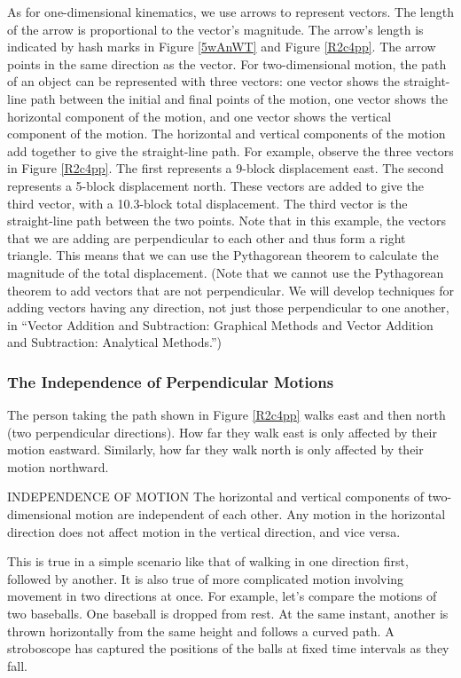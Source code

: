 \documentclass[../../main-ap-physics.tex]{subfiles}
\begin{document}
As for one-dimensional kinematics, we use arrows to represent vectors. The length of the arrow is proportional to the vector's magnitude. The arrow's length is indicated by hash marks in Figure \ref{5wAnWT} and Figure \ref{R2c4pp}. The arrow points in the same direction as the vector. For two-dimensional motion, the path of an object can be represented with three vectors: one vector shows the straight-line path between the initial and final points of the motion, one vector shows the horizontal component of the motion, and one vector shows the vertical component of the motion. The horizontal and vertical components of the motion add together to give the straight-line path. For example, observe the three vectors in Figure \ref{R2c4pp}. The first represents a 9-block displacement east. The second represents a 5-block displacement north. These vectors are added to give the third vector, with a 10.3-block total displacement. The third vector is the straight-line path between the two points. Note that in this example, the vectors that we are adding are perpendicular to each other and thus form a right triangle. This means that we can use the Pythagorean theorem to calculate the magnitude of the total displacement. (Note that we cannot use the Pythagorean theorem to add vectors that are not perpendicular. We will develop techniques for adding vectors having any direction, not just those perpendicular to one another, in ``Vector Addition and Subtraction: Graphical Methods and Vector Addition and Subtraction: Analytical Methods.'')

\subsubsection*{The Independence of Perpendicular Motions}

The person taking the path shown in Figure \ref{R2c4pp} walks east and then north (two perpendicular directions). How far they walk east is only affected by their motion eastward. Similarly, how far they walk north is only affected by their motion northward.

\begin{gradient}{INDEPENDENCE OF MOTION}
    The horizontal and vertical components of two-dimensional motion are independent of each other. Any motion in the horizontal direction does not affect motion in the vertical direction, and vice versa.
\end{gradient}

This is true in a simple scenario like that of walking in one direction first, followed by another. It is also true of more complicated motion involving movement in two directions at once. For example, let's compare the motions of two baseballs. One baseball is dropped from rest. At the same instant, another is thrown horizontally from the same height and follows a curved path. A stroboscope has captured the positions of the balls at fixed time intervals as they fall.
\end{document}
